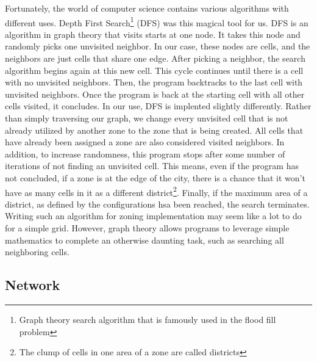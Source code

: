 \documentclass[11pt]{article}
\begin{document}
\begin{multicols}{2}
    \quad Fortunately, the world of computer science contains various algorithms with different uses. Depth First Search\footnote{Graph theory search algorithm that is famously used in the flood fill problem} (DFS) was this magical tool for us. DFS is an algorithm in graph theory that visits starts at one node. It takes this node and randomly picks one unvisited neighbor. In our case, these nodes are cells, and the neighbors are just cells that share one edge. After picking a neighbor, the search algorithm begins again at this new cell. This cycle continues until there is a cell with no unvisited neighbors. Then, the program backtracks to the last cell with unvisited neighbors. Once the program is back at the starting cell with all other cells visited, it concludes. In our use, DFS is implented slightly differently. Rather than simply traversing our graph, we change every unvisited cell that is not already utilized by another zone to the zone that is being created. All cells that have already been assigned a zone are also considered visited neighbors. In addition, to increase randomness, this program stops after some number of iterations of not finding an unvisited cell. This means, even if the program has not concluded, if a zone is at the edge of the city, there is a chance that it won't have as many cells in it as a different district\footnote{The clump of cells in one area of a zone are called districts}. Finally, if the maximum area of a district, as defined by the configurations hsa been reached, the search terminates. Writing such an algorithm for zoning implementation may seem like a lot to do for a simple grid. However, graph theory allows programs to leverage simple mathematics to complete an otherwise daunting task, such as searching all neighboring cells.

    \subsection{Network} \label{network}
    

\end{multicols}
\end{document}
